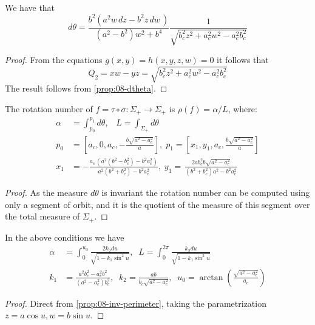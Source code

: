  
 
 
 \begin{proposition}
 We have that
 \[d\theta={\frac {{b}^{2} \left( {a}^{2}{  w\,dz} -{b}^{2}{ z\, dw}\, 
 \right) }{ ({a}^{2}-b^2)w^2+{b}^{4} }{\frac {1}{\sqrt {
b_c^{2}z^{2} + a_c^2 {w}^{2}  -a_c^2b_c^{2}      }}}}\]

 
 \end{proposition}
 \begin{proof}
 From the equations $g(x,y)=h(x,y,z,w)=0$ it follows that
 \[ Q_2=xw-yz=\sqrt{ b_c^2 z^2+  a_c^2 w^2      -a_c^2 b_c^2}  \]
 The result follows from \cref{prop:08-dtheta}.
 \end{proof}
 
\begin{proposition} 
The rotation number of $f=\tau\circ\sigma:\Sigma_+\to \Sigma_+$
is $\rho(f)=\alpha/L$, where:
\begin{align*}
  \alpha &= \int_{p_0}^{p_{1}}d\theta, \;\;\; L=\int_{\Sigma_+} d\theta    \\ p_0&=\left[a_c,0,a_c,-\frac{b\sqrt{a^2 - a_c^2}}{a}\right], \;p_1=\left[x_1,y_1, a_c,\frac{b\sqrt{a^2 - a_c^2}}{a}\right]\\
    x_1&=-\frac {a_c\, \left( {a}^{2}({b}^{2}- b_c^{2})-{b}^{2}a_c^{2} \right) }{a^{2}(b^{2}+ b_c^{2})-b^{2}
a_c^2}, \; y_1= \,\frac {2 a b_c^{2}b\sqrt {{a}^{2}-a_c^{2}}}{ \left( {b}^{2}+b_c^{2} \right) {a}^{2}-{b}^{2}a_c^2}
    \end{align*}
    \label{prop:08-rotation}
 \end{proposition}
  \begin{proof}
  As the measure $d\theta$ is invariant the rotation number can be computed using only a segment of orbit, and it is the quotient of the measure of this segment over the total measure of $\Sigma_+$.
  \end{proof}
 
 \begin{corollary}
 In the above conditions we have
 \begin{align*}
     \alpha &=\int_{0}^{u_0}\frac{2k_2du}{\sqrt{1-k_1\sin^2 u}},\;\; L=\int_{0}^{2\pi}\frac{k_2du}{\sqrt{1-k_1\sin^2 u}}\\
     k_1&=\frac{a^2 b_c^2 - a_c^2 b^2 }{(a^2  - a_c^2) b_c^2},\;\; k_2=\frac{ab}{b_c\sqrt{a^2   - a_c^2}  },\;\;
     u_0=\arctan{\left(\frac{\sqrt{a^2-a_c^2}}{a_c}\right)}
 \end{align*}
 \end{corollary}
 
 \begin{proof}
 Direct from \cref{prop:08-inv-perimeter},  taking the parametrization $z=a\cos u, w=b\sin u$.
 \end{proof}


